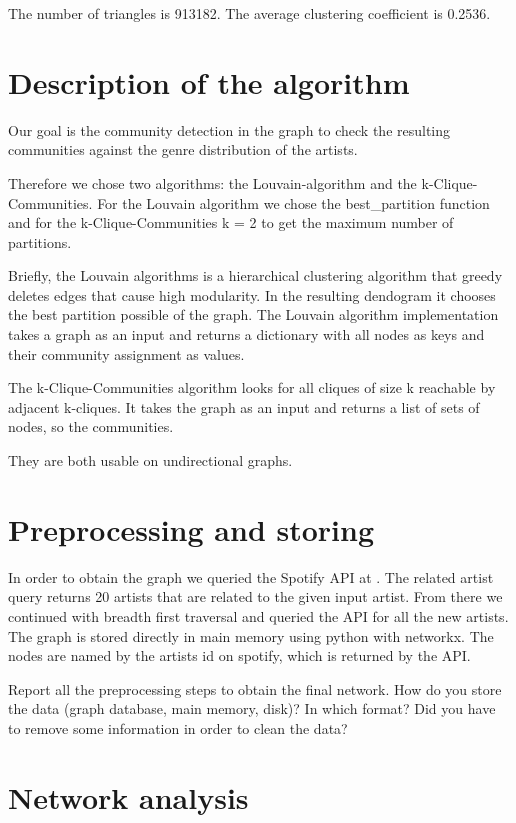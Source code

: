 \documentclass[11pt,a4paper,onecolumn,notitlepage]{article}
\begin{document}
The number of triangles is 913182. The average clustering coefficient is 0.2536.

\section{Description of the algorithm}

Our goal is the community detection in the graph to check the resulting communities against the genre distribution of the artists.

Therefore we chose two algorithms: the Louvain-algorithm\cite{louvain} and the k-Clique-Communities\cite{kclique}. For the Louvain algorithm we chose the best_partition function and for the k-Clique-Communities k = 2 to get the maximum number of partitions.

Briefly, the Louvain algorithms is a hierarchical clustering algorithm that greedy deletes edges that cause high modularity. In the resulting dendogram it chooses the best partition possible of the graph. The Louvain algorithm implementation takes a graph as an input and returns a dictionary with all nodes as keys and their community assignment as values. 

The k-Clique-Communities algorithm looks for all cliques of size k reachable by adjacent k-cliques. It takes the graph as an input and returns a list of sets of nodes, so the communities.

They are both usable on undirectional graphs.

\section{Preprocessing and storing}

In order to obtain the graph we queried the Spotify API at \cite{spotifyapi}. The related artist query returns 20 artists that are related to the given input artist.
From there we continued with breadth first traversal and queried the API for all the new artists. The graph is stored directly in main memory using python with networkx.
The nodes are named by the artists id on spotify, which is returned by the API.

Report all the preprocessing steps to obtain the final network. How do you store the data (graph database, main memory, disk)? In which format? Did you have to remove some information in order to clean the data? 

\section{Network analysis}
\end{document}
